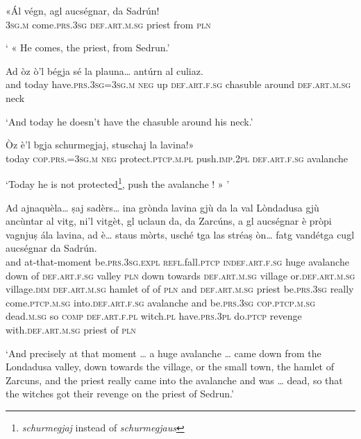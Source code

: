 \begin{linenumbers}
\gll  «Ál végn, agl aucségnar, da Sadrún! \\
 \textsc{3sg.m} come.\textsc{prs.3sg} \textsc{def.art.m.sg} priest from \textsc{pln}  \\
\end{linenumbers}
\medskip
\glt ` « He comes, the priest, from Sedrun.'
\medskip

\begin{linenumbers}
\gll    Ad òz ò’l bégja sé la plauna… antúrn al culiaz.\\
and today have.\textsc{prs.3sg=3sg.m} \textsc{neg} up \textsc{def.art.f.sg} chasuble around \textsc{def.art.m.sg} neck  \\
\end{linenumbers}
\medskip
\glt `And today he doesn’t have the chasuble around his neck.'
\medskip

\begin{linenumbers}
\gll  Òz è’l bgja schurmegjaj, stuschaj la lavina!» \\
today \textsc{cop.prs.=3sg.m} \textsc{neg} protect.\textsc{ptcp.m.pl} push.\textsc{imp.2pl} \textsc{def.art.f.sg} avalanche \\
\end{linenumbers}
\medskip
\glt `Today he is not protected\footnote{\textit{schurmegjaj} instead of \textit{schurmegjaus}}, push the avalanche ! » '
\medskip\textit{}

\begin{linenumbers}
\gll    Ad ajnaquèla… ṣaj sadèrs… ina grònda lavina gjù da la val Lòndadusa gjù ancùntar al vitg, ni’l vitgèt, gl uclaun da, da Zarcúns, a gl aucségnar è pròpi vagnjuṣ ála lavina, ad è… staus mòrts, usché tga las stréaṣ òn… fatg vandétga cugl aucségnar da Sadrún.\\
and at-that-moment be.\textsc{prs.3sg.expl} \textsc{refl.}fall.\textsc{ptcp} \textsc{indef.art.f.sg} huge avalanche down of  \textsc{def.art.f.sg} valley \textsc{pln} down towards \textsc{def.art.m.sg} village or.\textsc{def.art.m.sg} village.\textsc{dim} \textsc{def.art.m.sg} hamlet of of \textsc{pln} and \textsc{def.art.m.sg} priest be.\textsc{prs.3sg} really come.\textsc{ptcp.m.sg} into.\textsc{def.art.f.sg} avalanche and be.\textsc{prs.3sg} \textsc{cop.ptcp.m.sg} dead.\textsc{m.sg} so \textsc{comp} \textsc{def.art.f.pl} witch.\textsc{pl} have.\textsc{prs.3pl} do.\textsc{ptcp} revenge with.\textsc{def.art.m.sg} priest of \textsc{pln}\\
\end{linenumbers}
\medskip
\glt `And precisely at that moment … a huge avalanche … came down from the Londadusa valley, down towards the village, or the small town, the hamlet of Zarcuns, and the priest really came into the avalanche and was … dead, so that the witches got their revenge on the priest of Sedrun.'
\medskip

